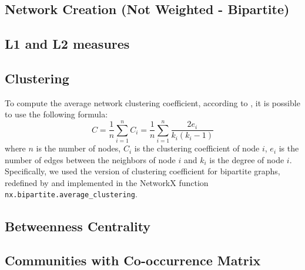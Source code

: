 
\subsection{Network Creation (Not Weighted - Bipartite)}

\subsection{L1 and L2 measures}

\subsection{Clustering}
To compute the average network clustering coefficient, according to \cite[Watts and Strogatz]{Watts_Strogatz_1998}, it is possible to use the following
formula: 
\begin{equation}
    C = \frac{1}{n}\sum_{i = 1}^{n} C_i = \frac{1}{n}\sum_{i = 1}^{n} \frac{2e_i}{k_i(k_i-1)}
\end{equation}
where $n$ is the number of nodes, $C_i$ is the clustering coefficient of node $i$, $e_i$ is the number of edges between the neighbors of node $i$ and $k_i$ is the degree of node $i$.
Specifically, we used the version of clustering coefficient for bipartite graphs, redefined by \cite[Latapy et al.]{Latapy_Magnien_Vecchio_2008} and implemented
in the NetworkX function \texttt{nx.bipartite.average\_clustering}.


\subsection{Betweenness Centrality}

\subsection{Communities with Co-occurrence Matrix}


